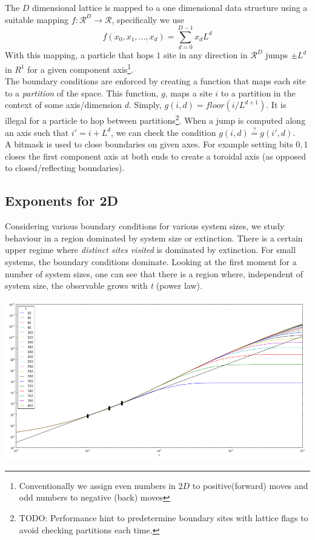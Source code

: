 \documentclass{article}
\begin{document}
\begin{multicols}{2}
The $D$ dimensional lattice is mapped to a one dimensional data structure using a suitable mapping $f: \mathcal{R}^D\to \mathcal{R}$, specifically we use
\begin{equation}
f(x_0, x_1,..., x_d) = \sum_{d=0}^{D-1} x_d L^d
\end{equation}
With this mapping, a particle that hops $1$ site in any direction in $\mathcal{R}^D$ jumps $\pm L^d$ in $R^1$ for a given component axis\footnote{Conventionally we assign even numbers in $2D$ to positive(forward) moves and odd numbers to negative (back) moves}. \\
The boundary conditions are enforced by creating a function that maps each site to a \textit{partition} of the space. This function, $g$, maps a site $i$ to a partition in the context of some axis/dimension $d$. Simply, $g(i,d)=floor(i/L^{d+1})$. It is illegal for a particle to hop between partitions\footnote{TODO: Performance hint to predetermine boundary sites with lattice flags to avoid checking partitions each time. }. When a jump is computed along an axis such that $i'= i + L^d$, we can check the condition $g(i,d)\stackrel{?}{=}g(i',d)$.
\\
A bitmask is used to close boundaries on given axes. For example setting bits $0,1$ closes the first component axis at both ends to create a toroidal axis (as opposed to closed/reflecting boundaries).


\subsection{Exponents for 2D}
Considering various boundary conditions for various system sizes, we study behaviour in a region dominated by system size or extinction. There is a certain upper regime where \textit{distinct sites visited} is dominated by extinction. For small systems, the boundary conditions dominate. Looking at the first moment for a number of system sizes, one can see that there is a region where, independent of system size, the observable grows with \textit{t} (power law).


\begin{center}
	\includegraphics[scale=0.3]{sample1}
\end{center}



\end{multicols}
\end{document}
